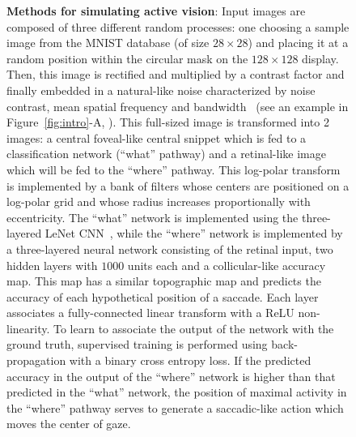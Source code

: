 \begin{figure}[t!]%
\caption{%
{\bf Methods for simulating active vision}:
\A Input images are composed of three different random processes: one choosing a sample image from the MNIST database (of size $28\times 28$) and placing it at a random position within the circular mask on the $128\times 128$ display. Then, this image is rectified and multiplied by a contrast factor and finally embedded in a natural-like noise characterized by noise contrast, mean spatial frequency and bandwidth~\citep{Sanz12} (see an example in Figure~\ref{fig:intro}-A, \DIS ). %
\B This full-sized image is transformed into 2 images: a central foveal-like central snippet which is fed to a classification network (``what'' pathway) and a retinal-like image which will be fed to the ``where'' pathway. This log-polar transform is implemented by a bank of filters whose centers are positioned on a log-polar grid and whose radius increases proportionally with eccentricity. %
\C 
The ``what'' network is implemented using the three-layered LeNet CNN~\citep{Lecun1998}, while the ``where'' network is implemented by a three-layered neural network consisting of the retinal input, two hidden layers with $1000$ units each and a collicular-like accuracy map.  This map has a similar topographic map and predicts the accuracy of each hypothetical position of a saccade.  Each layer associates a fully-connected linear transform with a ReLU non-linearity. To learn to associate the output of the network with the ground truth, supervised training is performed using back-propagation with a binary cross entropy loss. 
\D 
If the predicted accuracy in the output of the ``where'' network is higher than that predicted in the ``what'' network, the position of maximal activity in the ``where'' pathway serves to generate a saccadic-like action which moves the center of gaze. %
\label{fig:methods}}%
\end{figure}%

